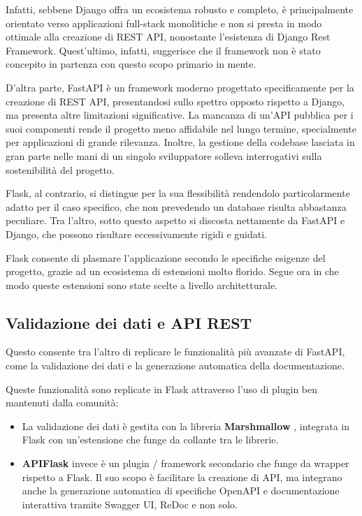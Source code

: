 Infatti, sebbene Django offra un ecosistema robusto e completo, è principalmente orientato verso applicazioni full-stack monolitiche e non si presta in modo ottimale alla creazione di REST API, nonostante l'esistenza di Django Rest Framework. Quest'ultimo, infatti, suggerisce che il framework non è stato concepito in partenza con questo scopo primario in mente.

D'altra parte, FastAPI è un framework moderno progettato specificamente per la creazione di REST API, presentandosi sullo spettro opposto rispetto a Django, ma presenta altre limitazioni significative. La mancanza di un'API pubblica per i suoi componenti rende il progetto meno affidabile nel lungo termine, specialmente per applicazioni di grande rilevanza. Inoltre, la gestione della codebase lasciata in gran parte nelle mani di un singolo sviluppatore solleva interrogativi sulla sostenibilità del progetto.

Flask, al contrario, si distingue per la sua flessibilità rendendolo particolarmente adatto per il caso specifico, che non prevedendo un database risulta abbastanza peculiare. Tra l'altro, sotto questo aspetto si discosta nettamente da FastAPI e Django, che possono risultare eccessivamente rigidi e guidati.

Flask consente di plasmare l'applicazione secondo le specifiche esigenze del progetto, grazie ad un ecosistema di estensioni molto florido. Segue ora in che modo queste estensioni sono state scelte a livello architetturale.

\subsection{Validazione dei dati e API REST}
Questo consente tra l'altro di replicare le funzionalità più avanzate di FastAPI, come la validazione dei dati e la generazione automatica della documentazione.

Queste funzionalità sono replicate in Flask attraverso l'uso di plugin ben mantenuti dalla comunità:
\begin{itemize}
    \item La validazione dei dati è gestita con la libreria \textbf{Marshmallow} \cite{marshmallow}, integrata in Flask con un'estensione che funge da collante tra le librerie.
    \label{design-marshmallow}
    \item \textbf{APIFlask} \cite{apiflask} invece è un plugin / framework secondario che funge da wrapper rispetto a Flask. Il suo scopo è facilitare la creazione di API, ma integrano anche la generazione automatica di specifiche OpenAPI \cite{openapi-specification} e documentazione interattiva tramite Swagger UI, ReDoc e non solo.
\end{itemize}

